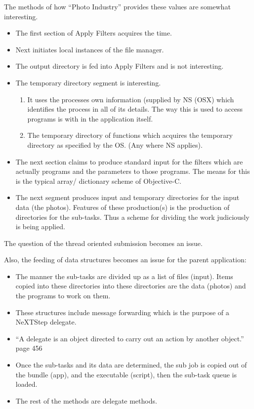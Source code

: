 \documentclass[11pt]{article}
\begin{document}
\newpage
The methods of how ``Photo Industry'' provides these values are somewhat interesting.  
\begin{itemize}
\item The first section of Apply Filters acquires the time.   
\item Next initiates local instances of the file manager.  
\item The output directory is fed into Apply Filters and is not interesting.  
\item The temporary directory segment is interesting.  
\begin{enumerate}
\item It uses the processes own information (supplied by NS (OSX) which identifies the process in all of its details.  The way this is used to access programs is with in the application itself.  
\item The temporary directory of functions which acquires the temporary directory as specified by the OS.  (Any where NS applies). 
\end{enumerate}
\item The next section claims to produce standard input for the filters which are actually programs and the parameters to those programs.  The means for this is the typical array/ dictionary scheme of Objective-C.  
\item The next segment produces input and temporary directories for the input data (the photos).  Features of these production(s) is the production of directories for the sub-tasks.  Thus a scheme for dividing the work judiciously is being applied.  
\end{itemize}
The question of the thread oriented submission becomes an issue.

Also, the feeding of data structures becomes an issue for the parent application:
\begin{itemize}
\item The manner the sub-tasks are divided up as a list of files (input).   Items copied into these directories into these directories are the data (photos) and the programs to work on them.
\item These structures include message forwarding which is the purpose of a NeXTStep delegate.  
\item ``A delegate is an object directed to carry out an action by another object.'' page 456 \cite {Kochan}
\item Once the sub-tasks and its data are determined, the sub job is copied out of the bundle (app), and the executable (script), then the sub-task queue is loaded.  
\item The rest of the methods are delegate methods.

\end{itemize}
\end{document}
